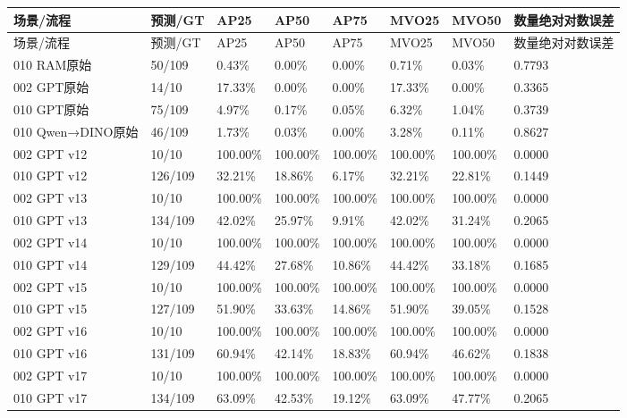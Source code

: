 \documentclass[UTF8,fontset=fandol]{ctexart}
\begin{document}
{\small
\begin{longtable}{|p{}|p{}|p{}|p{}|p{}|p{}|p{}|p{}|}
\hline
场景/流程 & 预测/GT & AP25 & AP50 & AP75 & MVO25 & MVO50 & 数量绝对对数误差 \\ \hline
\endfirsthead
\hline
场景/流程 & 预测/GT & AP25 & AP50 & AP75 & MVO25 & MVO50 & 数量绝对对数误差 \\ \hline
\endhead
010 RAM原始 & 50/109 & 0.43\% & 0.00\% & 0.00\% & 0.71\% & 0.03\% & 0.7793 \\ \hline
002 GPT原始 & 14/10 & 17.33\% & 0.00\% & 0.00\% & 17.33\% & 0.00\% & 0.3365 \\ \hline
010 GPT原始 & 75/109 & 4.97\% & 0.17\% & 0.05\% & 6.32\% & 1.04\% & 0.3739 \\ \hline
010 Qwen→DINO原始 & 46/109 & 1.73\% & 0.03\% & 0.00\% & 3.28\% & 0.11\% & 0.8627 \\ \hline
002 GPT v12 & 10/10 & 100.00\% & 100.00\% & 100.00\% & 100.00\% & 100.00\% & 0.0000 \\ \hline
010 GPT v12 & 126/109 & 32.21\% & 18.86\% & 6.17\% & 32.21\% & 22.81\% & 0.1449 \\ \hline
002 GPT v13 & 10/10 & 100.00\% & 100.00\% & 100.00\% & 100.00\% & 100.00\% & 0.0000 \\ \hline
010 GPT v13 & 134/109 & 42.02\% & 25.97\% & 9.91\% & 42.02\% & 31.24\% & 0.2065 \\ \hline
002 GPT v14 & 10/10 & 100.00\% & 100.00\% & 100.00\% & 100.00\% & 100.00\% & 0.0000 \\ \hline
010 GPT v14 & 129/109 & 44.42\% & 27.68\% & 10.86\% & 44.42\% & 33.18\% & 0.1685 \\ \hline
002 GPT v15 & 10/10 & 100.00\% & 100.00\% & 100.00\% & 100.00\% & 100.00\% & 0.0000 \\ \hline
010 GPT v15 & 127/109 & 51.90\% & 33.63\% & 14.86\% & 51.90\% & 39.05\% & 0.1528 \\ \hline
002 GPT v16 & 10/10 & 100.00\% & 100.00\% & 100.00\% & 100.00\% & 100.00\% & 0.0000 \\ \hline
010 GPT v16 & 131/109 & 60.94\% & 42.14\% & 18.83\% & 60.94\% & 46.62\% & 0.1838 \\ \hline
002 GPT v17 & 10/10 & 100.00\% & 100.00\% & 100.00\% & 100.00\% & 100.00\% & 0.0000 \\ \hline
010 GPT v17 & 134/109 & 63.09\% & 42.53\% & 19.12\% & 63.09\% & 47.77\% & 0.2065 \\ \hline
\end{longtable}
}
\end{document}
